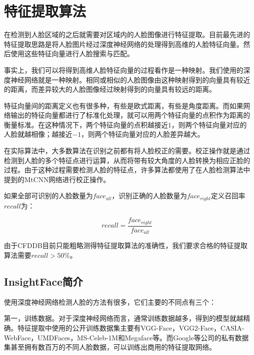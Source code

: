 \chapter{特征提取算法}
\label{facerecognition}

在检测到人脸区域的之后就需要对区域内的人脸图像进行特征提取。目前最先进的特征提取思路是将人脸图片经过深度神经网络的处理得到高维的人脸特征向量。然后使用这些特征向量进行人脸搜索与匹配。

事实上，我们可以将得到高维人脸特征向量的过程看作是一种映射。我们使用的深度神经网络就是一种映射。相同或相似的人脸图像由这种映射得到的向量具有较近的距离，而差异较大的人脸图像经过映射得到的向量具有较远的距离。

特征向量间的距离定义也有很多种，有些是欧式距离，有些是角度距离。而如果网络输出的特征向量都进行了标准化处理，就可以用两个特征向量的点积作为距离的衡量标准。在这种情况下，两个特征向量的点积越接近$1$，则两个特征向量对应的人脸就越相像；越接近$-1$，则两个特征向量对应的人脸差异越大。

在实际算法中，大多数算法在识别之前都有将人脸校正的需要。校正操作就是通过检测到人脸的多个特征点进行运算，从而将带有较大角度的人脸转换为相应正脸的过程。由于这种过程需要检测人脸的特征点，许多算法都使用了在人脸检测算法中提到的MtCNN网络\cite{zhang2016joint}进行校正操作。

如果全部可识别的人脸数量为$face_{all}$，识别正确的人脸数量为$face_{right}$定义召回率$recall$为：

\begin{equation}
\label{eq:rrdef}
recall = \frac{face_{right}}{face_{all}} 
\end{equation}

由于CFDDB目前只能粗略测得特征提取算法的准确性，我们要求合格的特征提取算法需要$recall>50\%$。

\section{InsightFace\cite{deng2018arcface}简介}

使用深度神经网络检测人脸的方法有很多，它们主要的不同点有三个：

第一，训练数据。对于深度神经网络而言，通常训练数据越多，得到的模型就越精确。特征提取中使用的公开训练数据集主要有VGG-Face\cite{parkhi2015deep}，VGG2-Face\cite{cao2017vggface2}，CASIA-WebFace\cite{yi2014learning}，UMDFaces\cite{bansal2017umdfaces}，MS-Celeb-1M\cite{guo2016msceleb}和Megaface\cite{nech2017level}等。而Google等公司的私有数据集甚至拥有数百万的不同人脸数据，可以训练出商用的特征提取网络。

